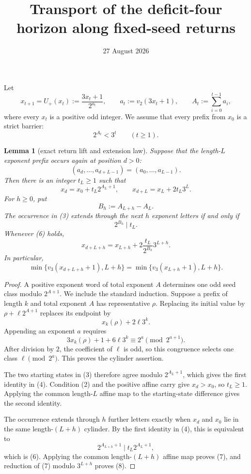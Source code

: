 \documentclass[11pt]{article}
\title{Transport of the deficit-four horizon along fixed-seed returns}
\author{}
\date{27 August 2026}
\newtheorem{lemma}[theorem]{Lemma}
\newcommand{\Up}{U_+}
\begin{document}
\maketitle

Let
\[
  x_{t+1}=\Up(x_t):=\frac{3x_t+1}{2^{a_t}},
  \qquad
  a_t:=v_2(3x_t+1),
  \qquad
  A_t:=\sum_{i=0}^{t-1}a_i,
  \tag{1}
\]
where every $x_t$ is a positive odd integer.  We assume that every prefix
from $x_0$ is a strict barrier:
\[
  2^{A_t}<3^t
  \qquad(t\geq1).
  \tag{2}
\]

\begin{lemma}[exact return lift and extension law]
Suppose that the length-$L$ exponent prefix occurs again at position $d>0$:
\[
  (a_d,\ldots,a_{d+L-1})=(a_0,\ldots,a_{L-1}).
  \tag{3}
\]
Then there is an integer $t_L\geq1$ such that
\[
\boxed{
  x_d=x_0+t_L2^{A_L+1},
  \qquad
  x_{d+L}=x_L+2t_L3^L.}
\tag{4}
\]
For $h\geq0$, put
\[
  B_h:=A_{L+h}-A_L.
  \tag{5}
\]
The occurrence in (3) extends through the next $h$ exponent letters if and
only if
\[
\boxed{2^{B_h}\mid t_L.}
\tag{6}
\]
Whenever (6) holds,
\[
\boxed{
  x_{d+L+h}=x_{L+h}
  +2\frac{t_L}{2^{B_h}}3^{L+h}.}
\tag{7}
\]
In particular,
\[
  \min\{v_3(x_{d+L+h}+1),L+h\}
  =\min\{v_3(x_{L+h}+1),L+h\}.
  \tag{8}
\]
\end{lemma}

\begin{proof}
A positive exponent word of total exponent $A$ determines one odd seed class
modulo $2^{A+1}$.  We include the standard induction.  Suppose a prefix of
length $k$ and total exponent $A$ has representative $\rho$.  Replacing its
initial value by $\rho+\ell2^{A+1}$ replaces its endpoint by
\[
  x_k(\rho)+2\ell3^k.
\]
Appending an exponent $a$ requires
\[
  3x_k(\rho)+1+6\ell3^k\equiv2^a\pmod {2^{a+1}}.
\]
After division by $2$, the coefficient of $\ell$ is odd, so this congruence
selects one class $\ell\pmod {2^a}$.  This proves the cylinder assertion.

The two starting states in (3) therefore agree modulo $2^{A_L+1}$, which
gives the first identity in (4).  Condition (2) and the positive affine carry
give $x_d>x_0$, so $t_L\geq1$.  Applying the common length-$L$ affine map to
the starting-state difference gives the second identity.

The occurrence extends through $h$ further letters exactly when $x_d$ and
$x_0$ lie in the same length-$(L+h)$ cylinder.  By the first identity in
(4), this is equivalent to
\[
  2^{A_{L+h}+1}\mid t_L2^{A_L+1},
\]
which is (6).  Applying the common length-$(L+h)$ affine map proves (7), and
reduction of (7) modulo $3^{L+h}$ proves (8).
\end{proof}
\end{document}
